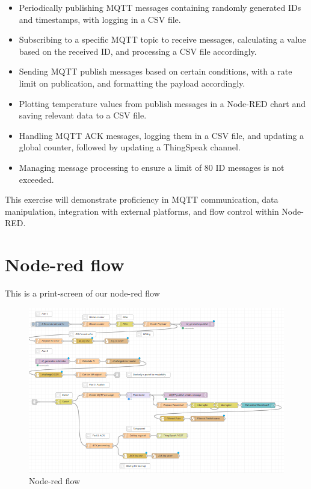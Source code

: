 \documentclass{article}
\begin{document}
\begin{itemize}
    \item Periodically publishing MQTT messages containing randomly generated IDs and timestamps, with logging in a CSV file.
    \item Subscribing to a specific MQTT topic to receive messages, calculating a value based on the received ID, and processing a CSV file accordingly.
    \item Sending MQTT publish messages based on certain conditions, with a rate limit on publication, and formatting the payload accordingly.
    \item Plotting temperature values from publish messages in a Node-RED chart and saving relevant data to a CSV file.
    \item Handling MQTT ACK messages, logging them in a CSV file, and updating a global counter, followed by updating a ThingSpeak channel.
    \item Managing message processing to ensure a limit of 80 ID messages is not exceeded.
\end{itemize}

This exercise will demonstrate proficiency in MQTT communication, data manipulation, integration with external platforms, and flow control within Node-RED.

\section{Node-red flow}

This is a print-screen of our node-red flow

\begin{figure}[htp]
    \centering
    \includegraphics[width=15cm]{Images/flow.png}
    \caption{Node-red flow}
    \label{fig:galaxy}
\end{figure}
\end{document}

